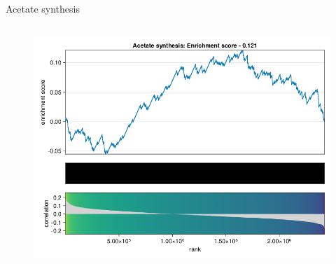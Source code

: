 \begin{frame}{Acetate synthesis}
    \begin{columns}[c] %

        \begin{figure}
            \includegraphics[width=1\linewidth]{../figures/fsea_Acetate-synthesis.png}
        \end{figure}

    \end{columns}

\end{frame}

